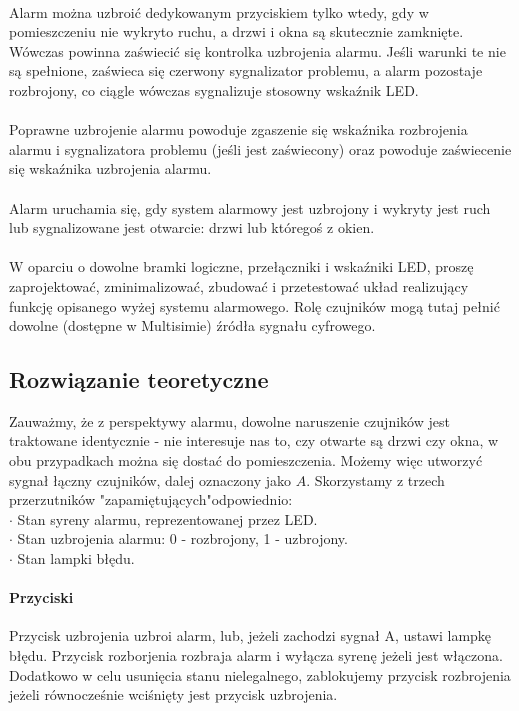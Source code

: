 \documentclass{article}
\begin{document}
\paragraph{}
Alarm można uzbroić dedykowanym przyciskiem tylko wtedy, gdy w pomieszczeniu nie wykryto ruchu, a drzwi i okna są skutecznie zamknięte. Wówczas powinna zaświecić się kontrolka uzbrojenia alarmu. Jeśli warunki te nie są spełnione, zaświeca się czerwony sygnalizator problemu, a alarm pozostaje rozbrojony, co ciągle wówczas sygnalizuje stosowny wskaźnik LED.
\paragraph{}
Poprawne uzbrojenie alarmu powoduje zgaszenie się wskaźnika rozbrojenia alarmu i sygnalizatora problemu (jeśli jest zaświecony) oraz powoduje zaświecenie się wskaźnika uzbrojenia alarmu.
\paragraph{}
Alarm uruchamia się, gdy system alarmowy jest uzbrojony i wykryty jest ruch lub sygnalizowane jest otwarcie: drzwi lub któregoś z okien.
\paragraph{}
W oparciu o dowolne bramki logiczne, przełączniki i wskaźniki LED, proszę zaprojektować, zminimalizować, zbudować i przetestować układ realizujący funkcję opisanego wyżej systemu alarmowego. Rolę czujników mogą tutaj pełnić dowolne (dostępne w Multisimie) źródła sygnału cyfrowego.
\subsection{Rozwiązanie teoretyczne}
Zauważmy, że z perspektywy alarmu, dowolne naruszenie czujników jest traktowane identycznie - nie interesuje nas to, czy otwarte są drzwi czy okna, w obu przypadkach można się dostać do pomieszczenia. Możemy więc utworzyć sygnał łączny czujników, dalej oznaczony jako $A$.
Skorzystamy z trzech przerzutników "zapamiętujących"odpowiednio: \\
$\cdot$ Stan syreny alarmu, reprezentowanej przez LED. \\
$\cdot$ Stan uzbrojenia alarmu: 0 - rozbrojony, 1 - uzbrojony. \\
$\cdot$ Stan lampki błędu. \\
\paragraph{Przyciski}
Przycisk uzbrojenia uzbroi alarm, lub, jeżeli zachodzi sygnał A, ustawi lampkę błędu.
Przycisk rozborjenia rozbraja alarm i wyłącza syrenę jeżeli jest włączona.
Dodatkowo w celu usunięcia stanu nielegalnego, zablokujemy przycisk rozbrojenia jeżeli równocześnie wciśnięty jest przycisk uzbrojenia.
\end{document}

